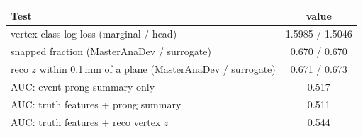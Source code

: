 \begin{tabular}{lc}
\toprule
Test & value \\
\midrule
vertex class log loss (marginal / head) & 1.5985 / 1.5046 \\
snapped fraction (MasterAnaDev / surrogate) & 0.670 / 0.670 \\
reco $z$ within 0.1\,mm of a plane (MasterAnaDev / surrogate) & 0.671 / 0.673 \\
\midrule
AUC: event prong summary only & 0.517 \\
AUC: truth features + prong summary & 0.511 \\
AUC: truth features + reco vertex $z$ & 0.544 \\
\bottomrule
\end{tabular}
